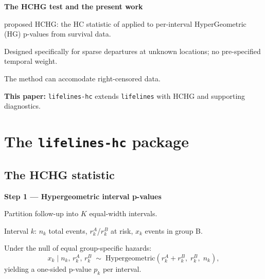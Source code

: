 \documentclass[unnumsec,webpdf,contemporary,large]{oup-authoring-template}
\let\origitemize\itemize
\let\origenditemize\enditemize
\renewenvironment{itemize}{%
  \origitemize
  \setlength{\itemsep}{1pt}%
  \setlength{\parskip}{0pt}%
  \setlength{\topsep}{3pt}%
}{\origenditemize}
\begin{document}
\textbf{The HCHG test and the present work}
\begin{itemize}
  \item \citet{kipnis_biometrika} proposed HCHG: the HC statistic of
        \citet{donoho2004,donoho2015special} applied to per-interval HyperGeometric (HG)
        p-values from survival data.
  \item Designed specifically for sparse departures at unknown locations;
        no pre-specified temporal weight.
\item The method can accomodate right-censored data. 
\item \textbf{This paper:} \texttt{lifelines-hc} extends
\texttt{lifelines} \citep{davidsonpilon2019} with HCHG and
supporting diagnostics.
\end{itemize}


\section{The \texttt{lifelines-hc} package}

\subsection*{The HCHG statistic}

\textbf{Step 1 — Hypergeometric interval p-values}
\begin{itemize}
  \item Partition follow-up into $K$ equal-width intervals.
  \item Interval $k$: $n_k$ total events, $r_k^A$/$r_k^B$ at risk,
        $x_k$ events in group B.
  \item Under the null of equal group-specific hazards:
\end{itemize}
%
\begin{equation}\label{eq:hypergeom}
  x_k \;\Big|\; n_k,\, r_k^A,\, r_k^B
  \;\sim\;
  \mathrm{Hypergeometric}\!\left(r_k^A + r_k^B,\; r_k^B,\; n_k\right),
\end{equation}
%
yielding a one-sided p-value $p_k$ per interval.
\end{document}
